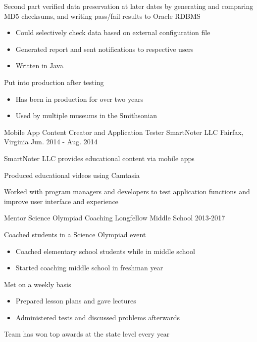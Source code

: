\begin{cventries}
{\begin{cvitems}
        \item {Second part verified data preservation at later dates by generating and comparing MD5 checksums, and writing pass/fail results to Oracle RDBMS}
        \begin{itemize}
            \item{Could selectively check data based on external configuration file}
            \item{Generated report and sent notifications to respective users}
            \item{Written in Java}
        \end{itemize}
        \item{Put into production after testing}
        \begin{itemize}
            \item{Has been in production for over two years}
            \item{Used by multiple museums in the Smithsonian}
        \end{itemize}
      \end{cvitems}
    }
    \cventry
    {Mobile App Content Creator and Application Tester}
    {SmartNoter LLC}
    {Fairfax, Virginia}
    {Jun. 2014 - Aug. 2014}
    {
        \begin{cvitems}
            \item{SmartNoter LLC provides educational content via mobile apps}
            \item{Produced educational videos using Camtasia}
            \item{Worked with program managers and developers to test application functions and improve user interface and experience}
        \end{cvitems}
    }
    \cventry
    {Mentor}
    {Science Olympiad Coaching}
    {Longfellow Middle School}
    {2013-2017}
    {
        \begin{cvitems}
        \item{Coached students in a Science Olympiad event}
        \begin{itemize}
            \item{Coached elementary school students while in middle school}
            \item{Started coaching middle school in freshman year}
        \end{itemize}
        \item{Met on a weekly basis}
        \begin{itemize}
            \item{Prepared lesson plans and gave lectures}
            \item{Administered tests and discussed problems afterwards}
        \end{itemize}
        \item{Team has won top awards at the state level every year}
        \end{cvitems}
    }
\end{cventries}

